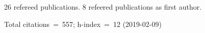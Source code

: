 26 refereed publications. 8 refeered publications as first author.

Total citations~=~557; h-index~=~12 (2019-02-09)